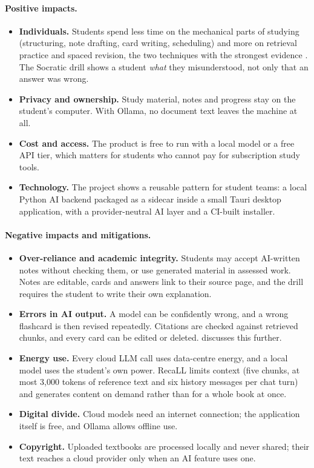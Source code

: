 \paragraph{Positive impacts.}
\begin{itemize}
  \item \textbf{Individuals.} Students spend less time on the mechanical parts of studying
  (structuring, note drafting, card writing, scheduling) and more on retrieval practice and
  spaced revision, the two techniques with the strongest evidence \cite{dunlosky2013}. The
  Socratic drill shows a student \emph{what} they misunderstood, not only that an answer was
  wrong.
  \item \textbf{Privacy and ownership.} Study material, notes and progress stay on the
  student's computer. With Ollama, no document text leaves the machine at all.
  \item \textbf{Cost and access.} The product is free to run with a local model or a free API
  tier, which matters for students who cannot pay for subscription study tools.
  \item \textbf{Technology.} The project shows a reusable pattern for student teams: a local
  Python AI backend packaged as a sidecar inside a small Tauri desktop application, with a
  provider-neutral AI layer and a CI-built installer.
\end{itemize}

\paragraph{Negative impacts and mitigations.}
\begin{itemize}
  \item \textbf{Over-reliance and academic integrity.} Students may accept AI-written notes
  without checking them, or use generated material in assessed work. Notes are editable,
  cards and answers link to their source page, and the drill requires the student to write
  their own explanation.
  \item \textbf{Errors in AI output.} A model can be confidently wrong, and a wrong flashcard
  is then revised repeatedly. Citations are checked against retrieved chunks, and every card
  can be edited or deleted.  discusses this further.
  \item \textbf{Energy use.} Every cloud LLM call uses data-centre energy, and a local model
  uses the student's own power. RecaLL limits context (five chunks, at most 3{,}000 tokens of
  reference text and six history messages per chat turn) and generates content on demand
  rather than for a whole book at once.
  \item \textbf{Digital divide.} Cloud models need an internet connection; the application
  itself is free, and Ollama allows offline use.
  \item \textbf{Copyright.} Uploaded textbooks are processed locally and never shared; their text
  reaches a cloud provider only when an AI feature uses one.
\end{itemize}
